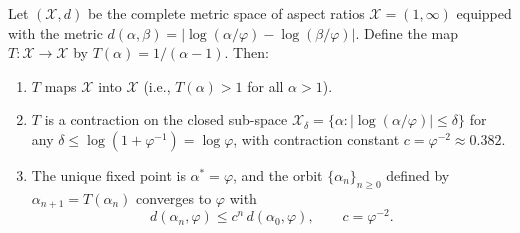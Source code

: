 \begin{theorem}
\label{thm:ch30-subdivision}
Let $(\mathcal{X}, d)$ be the complete metric
space of aspect ratios
$\mathcal{X} = (1, \infty)$ equipped with the
metric $d(\alpha, \beta)
= |\log(\alpha/\varphi) - \log(\beta/\varphi)|$.
Define the map $T : \mathcal{X} \to \mathcal{X}$
by $T(\alpha) = 1/(\alpha - 1)$.  Then:

\begin{enumerate}
  \item[(i)] $T$ maps $\mathcal{X}$ into
    $\mathcal{X}$ (i.e., $T(\alpha) > 1$ for all
    $\alpha > 1$).
  \item[(ii)] $T$ is a contraction on the closed
    sub-space
    $\mathcal{X}_{\delta} = \{\alpha :
    |\log(\alpha/\varphi)| \leq \delta\}$ for any
    $\delta \leq \log(1 + \varphi^{-1}) = \log\varphi$,
    with contraction constant
    $c = \varphi^{-2} \approx 0.382$.
  \item[(iii)] The unique fixed point is
    $\alpha^{*} = \varphi$, and the orbit
    $\{\alpha_n\}_{n \geq 0}$ defined by
    $\alpha_{n+1} = T(\alpha_n)$ converges to
    $\varphi$ with
    \[d(\alpha_n, \varphi)
      \leq c^n\, d(\alpha_0, \varphi),
      \qquad c = \varphi^{-2}.\]
\end{enumerate}
\end{theorem}

